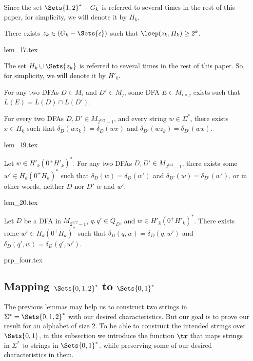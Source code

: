 \documentclass[preprint, 12pt]{elsarticle}
\begin{document}
	\begin{definition}
		Since the set $\Sets{1,2}^* - G_k$
		 is referred to several times in the rest of this paper, for simplicity, we will denote it by $H_k$.
\end{definition}
	
	
	\begin{lemma}
		\label{lem:17}
		There exists $z_k \in (G_k - \Sets{\epsilon})$ such that $\lsep(z_k, H_k) \geq 2^k$.
	\end{lemma}
	{lem_17.tex}
	
	\begin{definition}
		The set $H_k \cup \Sets{z_k}$
		 is referred to several times in the rest of this paper. So, for simplicity, we will denote it by $H'_k$.
	\end{definition}
	
	\begin{remark}
		\label{rem:spider}
		For any two DFAs $D \in M_i$ and $D' \in M_j$, some DFA $E \in M_{i \times j}$ exists such that $L(E) = L(D) \cap L(D')$.	
	\end{remark}

	
	\begin{lemma}
		\label{lem:19}
		For every two DFAs $D, D' \in M_{2^{k/2}-1}$, and every string $w \in \Sigma^*$, there exists $x \in H_k$ such that $\delta_D(w z_k) = \delta_D(w x)$ and $\delta_{D'}(w z_k) = \delta_{D'}(w x)$.
	\end{lemma}
	{lem_19.tex}
	

	\begin{lemma}
		\label{lem:20}
		Let $w \in H'_k \left(0^+ H'_k \right)^*$. For any two DFAs $D, D' \in M_{2^{k/2}-1}$, there exists some $w' \in H_k \left(0^+ H_k \right)^*$ such that $\delta_D(w) = \delta_D(w')$ and $\delta_{D'}(w) = \delta_{D'}(w')$, or in other words, neither $D$ nor $D'$ \distinguishes $w$ and $w'$.
	\end{lemma}
	{lem_20.tex}
	
	\begin{proposition}
		\label{prp:four}
		Let $D$ be a DFA in $M_{2^{k/2}-1}$, $q, q' \in Q_D$, and $w \in H'_k \left(0^+ H'_k \right)^*$. There exists some $w' \in H_k \left(0^+ H_k \right)^*$ such that $\delta_D(q, w) = \delta_D(q, w')$ and $\delta_D(q', w) = \delta_D(q', w')$. 
	\end{proposition}
	{prp_four.tex}
				

	
	\subsection{Mapping $\Sets{0,1,2}^*$ to $\Sets{0,1}^*$}
	\label{subsec:four}
	The previous lemmas may help us to construct two strings in $\Sigma^*=\Sets{0,1,2}^*$ with our desired characteristics. But our goal is to prove our result for an alphabet of size $2$. To be able to construct the intended strings over $\Sets{0,1}$, in this subsection we introduce the function $\tr$ that maps strings in $\Sigma^*$ to strings in $\Sets{0,1}^*$, while preserving some of our desired characteristics in them.
	
\end{document}
